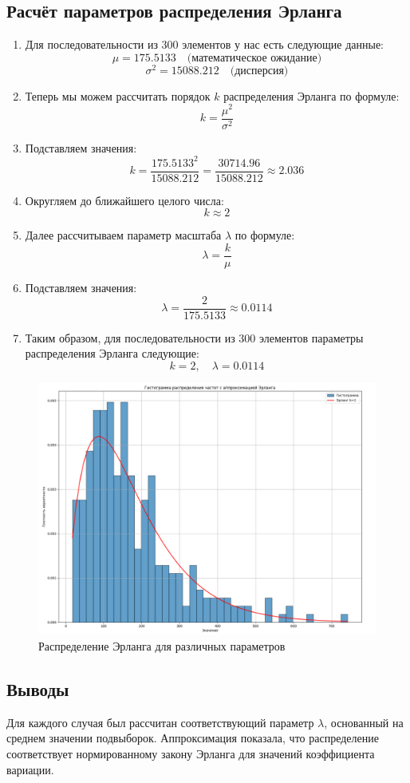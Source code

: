 \subsection{Расчёт параметров распределения Эрланга}

\begin{enumerate}
	\item Для последовательности из 300 элементов у нас есть следующие данные:
	      \[
		      \mu = 175.5133 \quad \text{(математическое ожидание)}
	      \]
	      \[
		      \sigma^2 = 15088.212 \quad \text{(дисперсия)}
	      \]

	\item Теперь мы можем рассчитать порядок \(k\) распределения Эрланга по формуле:
	      \[
		      k = \frac{\mu^2}{\sigma^2}
	      \]
	\item Подставляем значения:
	      \[
		      k = \frac{175.5133^2}{15088.212} = \frac{30714.96}{15088.212} \approx 2.036
	      \]
	\item Округляем до ближайшего целого числа:
	      \[
		      k \approx 2
	      \]

	\item Далее рассчитываем параметр масштаба \( \lambda \) по формуле:
	      \[
		      \lambda = \frac{k}{\mu}
	      \]
	\item Подставляем значения:
	      \[
		      \lambda = \frac{2}{175.5133} \approx 0.0114
	      \]

	\item Таким образом, для последовательности из 300 элементов параметры распределения Эрланга следующие:
	      \[
		      k = 2, \quad \lambda = 0.0114
	      \]

\end{enumerate}


\FloatBarrier
\begin{figure}[h]
	\centering
	\includegraphics[width=1\textwidth]{../data/histogram_approximated.png}
	\caption{Распределение Эрланга для различных параметров}
\end{figure}
\FloatBarrier

\subsection{Выводы}

Для каждого случая был рассчитан соответствующий параметр \(\lambda\), основанный на среднем значении подвыборок. Аппроксимация показала, что распределение соответствует нормированному закону Эрланга для значений коэффициента вариации.

